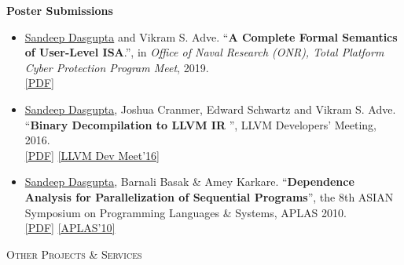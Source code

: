 \documentclass[9pt]{article}
\newenvironment{changemargin}[2]{%
  \begin{list}{}{%
    \setlength{\topsep}{0pt}%
    \setlength{\leftmargin}{#1}%
    \setlength{\rightmargin}{#2}%
    \setlength{\listparindent}{\parindent}%
    \setlength{\itemindent}{\parindent}%
    \setlength{\parsep}{\parskip}%
  }%
  \item[]}{\end{list}
}
\newcommand{\lineover}{
	\begin{changemargin}{-0.05in}{-0.05in}
		\vspace*{-8pt}
		\hrulefill \\
		\vspace*{-2pt}
	\end{changemargin}
}
\newcommand{\header}[1]{
	\begin{changemargin}{-0.5in}{-0.5in}
		\scshape{#1}\\
  	\lineover
	\end{changemargin}
}
\newenvironment{body} {
	\vspace*{-16pt}
	\begin{changemargin}{-0.25in}{-0.5in}
  }	
	{\end{changemargin}
}
\begin{document}
\begin{body}
\textbf{Poster Submissions}\\
	\vspace*{-4pt}
	\begin{itemize} \itemsep -0pt
                \item \underline{Sandeep Dasgupta} and Vikram S. Adve. ``\textbf{A Complete Formal Semantics of User-Level ISA}.'', in \emph{Office of Naval Research (ONR), Total Platform Cyber Protection Program Meet}, 2019. \\
  		\href{http://webhost.engr.illinois.edu/~sdasgup3/Document/onr-tpcp-19.pdf}{[PDF]}

                \item \underline{Sandeep Dasgupta}, Joshua Cranmer, Edward Schwartz and Vikram S. Adve. ``\textbf{Binary Decompilation to LLVM IR
                  }'', LLVM Developers' Meeting, 2016. \\
                  \href{http://webhost.engr.illinois.edu/~sdasgup3/Document/allin_poster.pdf}{[PDF]}
                  \href{https://llvm.org/devmtg/2016-11/}{[LLVM Dev Meet'16]}

                \item \underline{Sandeep Dasgupta}, Barnali Basak \& Amey Karkare. ``\textbf{Dependence Analysis for Parallelization of Sequential Programs}'', the 8th ASIAN
                  Symposium on Programming Languages \& Systems, APLAS 2010. \\
                  \href{http://webhost.engr.illinois.edu/~sdasgup3/Document/poster_APLAS2010.pdf}{[PDF]}
                  \href{https://basics.sjtu.edu.cn/conference/aplas2010/accepted_posters.htm}{[APLAS'10]}
	\end{itemize}


\end{body}

\smallskip

\header{Other Projects \& Services}
\end{document}

